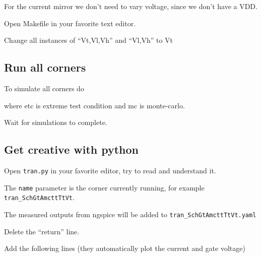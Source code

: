 For the current mirror we don't need to vary voltage, since we don't
have a VDD.

Open Makefile in your favorite text editor.

Change all instances of ``Vt,Vl,Vh'' and ``Vl,Vh'' to Vt

\subsection{Run all corners}\label{run-all-corners}

To simulate all corners do

\begin{Shaded}
\begin{Highlighting}[]
\end{Highlighting}
\end{Shaded}

where etc is extreme test condition and mc is monte-carlo.

Wait for simulations to complete.

\subsection{Get creative with python}\label{get-creative-with-python}

Open \texttt{tran.py} in your favorite editor, try to read and
understand it.

The \texttt{name} parameter is the corner currently running, for example
\texttt{tran\_SchGtAmcttTtVt}.

The measured outputs from ngspice will be added to
\texttt{tran\_SchGtAmcttTtVt.yaml}

Delete the ``return'' line.

Add the following lines (they automatically plot the current and gate
voltage)

\begin{Shaded}
\begin{Highlighting}[]
\OperatorTok{=}\OperatorTok{+}
\NormalTok{(}\SpecialCharTok{\{}\SpecialCharTok{\}}\NormalTok{)}
\OperatorTok{+} \NormalTok{,}\NormalTok{,} \OperatorTok{\textbackslash{}}
\OperatorTok{=}\OperatorTok{=}
\end{Highlighting}
\end{Shaded}

